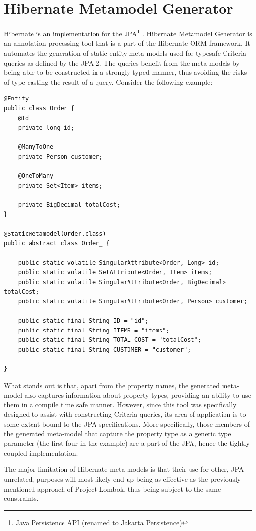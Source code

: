 \section{Hibernate Metamodel Generator}
Hibernate is an implementation for the JPA\footnote{Java Persistence API (renamed to Jakarta Persistence)} \cite{jpa}. Hibernate Metamodel Generator \cite{hmg} is an annotation processing tool that is a part of the Hibernate ORM framework.
It automates the generation of static entity meta-models used for typesafe Criteria queries as defined by the JPA 2.
The queries benefit from the meta-models by being able to be constructed in a strongly-typed manner, thus avoiding the risks of type casting the result of a query.
Consider the following example:

\begin{verbatim}
@Entity
public class Order {
    @Id
    private long id;

    @ManyToOne
    private Person customer;

    @OneToMany
    private Set<Item> items;

    private BigDecimal totalCost;
}

@StaticMetamodel(Order.class)
public abstract class Order_ {

    public static volatile SingularAttribute<Order, Long> id;
    public static volatile SetAttribute<Order, Item> items;
    public static volatile SingularAttribute<Order, BigDecimal> totalCost;
    public static volatile SingularAttribute<Order, Person> customer;

    public static final String ID = "id";
    public static final String ITEMS = "items";
    public static final String TOTAL_COST = "totalCost";
    public static final String CUSTOMER = "customer";

}

\end{verbatim}

What stands out is that, apart from the property names, the generated meta-model also captures information about property types, providing an ability to use them in a compile time safe manner. However, since this tool was specifically designed to assist with constructing Criteria queries, its area of application is to some extent bound to the JPA specifications. More specifically, those members of the generated meta-model that capture the property type as a generic type parameter (the first four in the example) are a part of the JPA, hence the tightly coupled implementation.

\n

The major limitation of Hibernate meta-models is that their use for other, JPA unrelated, purposes will most likely end up being as effective as the previously mentioned approach of Project Lombok, thus being subject to the same constraints.


